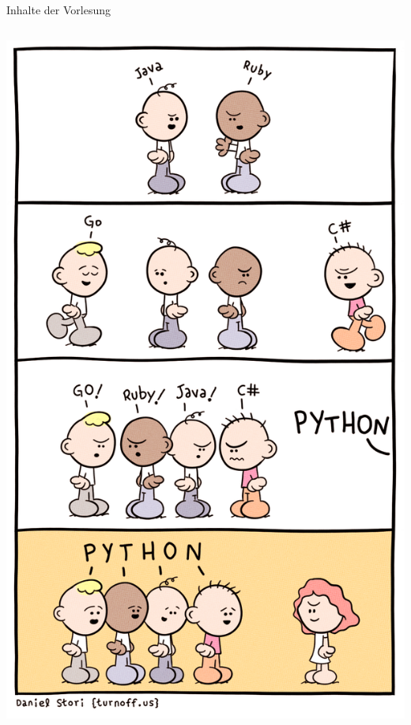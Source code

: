 {\begin{frame}{Inhalte der Vorlesung}
\begin{columns}
        \begin{column}[T]{.3\textwidth}
            \includegraphics[width=\textwidth]{img/depressed-developer-35}
        \end{column}
    \end{columns}

\end{frame}
}

